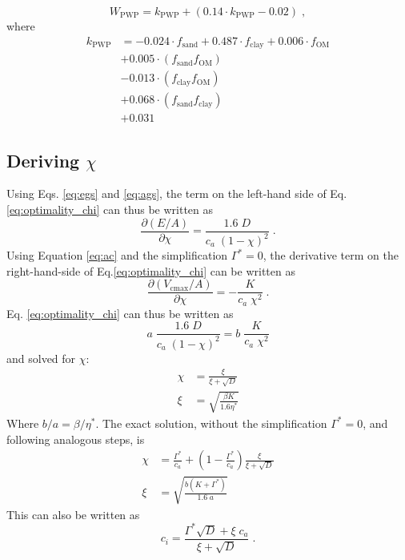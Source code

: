 \documentclass[gmd, manuscript]{copernicus}
\begin{document}
\begin{equation}
W_{\text{PWP}} = k_\text{PWP}+(0.14\cdot k_\text{PWP}-0.02) \;,
\end{equation}
where
\begin{align}
k_\text{PWP} & = -0.024 \cdot f_{\text{sand}} + 0.487 \cdot f_{\text{clay}} + 0.006 \cdot f_{\text{OM}} \\
                  &+0.005 \cdot ( f_{\text{sand}} f_{\text{OM}} )\\
                  &-0.013 \cdot ( f_{\text{clay}} f_{\text{OM}} )\\
                  &+0.068 \cdot ( f_{\text{sand}} f_{\text{clay}} )\\
                  &+0.031
\end{align}


\subsection{Deriving $\chi$}
\label{sec:steps_chi}

Using Eqs. \ref{eq:egs} and \ref{eq:ags}, the term on the left-hand side of Eq. \ref{eq:optimality_chi} can thus be written as
\begin{equation}
\label{eq:partial1}
    \frac{\partial (E/A)}{\partial \chi} = \frac{1.6\;D}{c_a\;(1-\chi)^2}\;.
\end{equation}
Using Equation \ref{eq:ac} and the simplification $\Gamma^{\ast}=0$, the derivative term on the right-hand-side of Eq.\ref{eq:optimality_chi} can be written as
\begin{equation}
\label{eq:partial2}
    \frac{\partial (V_{\mathrm{cmax}}/A)}{\partial \chi} = - \frac{K}{c_a\;\chi^2}\;.
\end{equation}
Eq. \ref{eq:optimality_chi} can thus be written as
\begin{equation}
    a\;\frac{1.6\;D}{c_a\;(1-\chi)^2} = b\;\frac{K}{c_a\;\chi^2}
\end{equation}
and solved for $\chi$:
\begin{align}
    \chi &= \frac{\xi}{\xi + \sqrt{D}} \\ 
    \xi &= \sqrt{\frac{\beta K}{1.6 \eta^\ast}}
\end{align}
Where $b/a=\beta/\eta^\ast$. The exact solution, without the simplification $\Gamma^{\ast}=0$, and following analogous steps, is 
\begin{align}
\label{eq:chi_exact}
    \chi &= \frac{\Gamma^{\ast}}{c_a} + \left(1- \frac{\Gamma^{\ast}}{c_a}\right)\frac{\xi}{\xi + \sqrt{D}}\\
    \xi &= \sqrt{\frac{b(K+\Gamma^{\ast})}{1.6\;a}}
\end{align}
This can also be written as
\begin{equation}
\label{eq:ci}
    c_i = \frac{\Gamma^{\ast}\sqrt{D}+ \xi\;c_a}{\xi + \sqrt{D}} \;. 
\end{equation}
\end{document}
